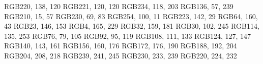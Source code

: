 \definecolor{cat-Rosewater}     {RGB}{220, 138, 120}
\definecolor{cat-Flamingo}      {RGB}{221, 120, 120}
\definecolor{cat-Pink}          {RGB}{234, 118, 203}
\definecolor{cat-Mauve}         {RGB}{136, 57, 239}
\definecolor{cat-Red}           {RGB}{210, 15, 57}
\definecolor{cat-Maroon}        {RGB}{230, 69, 83}
\definecolor{cat-Peach}         {RGB}{254, 100, 11}
\definecolor{cat-Yellow}        {RGB}{223, 142, 29}
\definecolor{cat-Green}         {RGB}{64, 160, 43}
\definecolor{cat-Teal}          {RGB}{23, 146, 153}
\definecolor{cat-Sky}           {RGB}{4, 165, 229}
\definecolor{cat-Sapphire}      {RGB}{32, 159, 181}
\definecolor{cat-Blue}          {RGB}{30, 102, 245}
\definecolor{cat-Lavender}      {RGB}{114, 135, 253}
\definecolor{cat-Text}          {RGB}{76, 79, 105}
\definecolor{cat-Subtext1}      {RGB}{92, 95, 119}
\definecolor{cat-Subtext0}      {RGB}{108, 111, 133}
\definecolor{cat-Overlay2}      {RGB}{124, 127, 147}
\definecolor{cat-Overlay1}      {RGB}{140, 143, 161}
\definecolor{cat-Overlay0}      {RGB}{156, 160, 176}
\definecolor{cat-Surface2}      {RGB}{172, 176, 190}
\definecolor{cat-Surface1}      {RGB}{188, 192, 204}
\definecolor{cat-Surface0}      {RGB}{204, 208, 218}
\definecolor{cat-Base}          {RGB}{239, 241, 245}
\definecolor{cat-Mantle}        {RGB}{230, 233, 239}
\definecolor{cat-Crust}         {RGB}{220, 224, 232}
